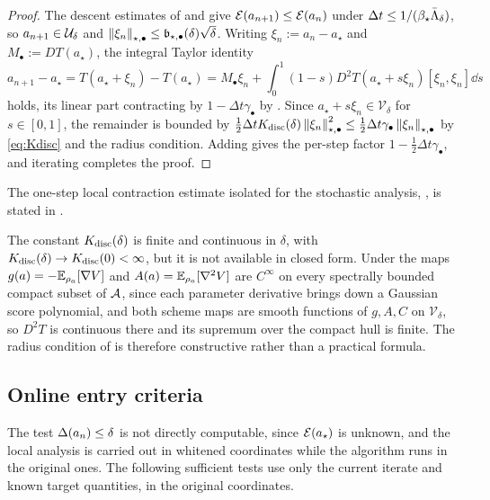 \begin{proof}
The descent estimates of  and  give
$\mathcal{E}(a_{n+1})\leq\mathcal{E}(a_n)$ under $\Delta t\leq1/(\beta_\star\bar\Lambda_\delta)$, so
$a_{n+1}\in\mathcal{U}_\delta$ and $\left\lVert \xi_n\right\rVert_{\star,\bullet}\leq\mathfrak b_{\star,\bullet}(\delta)\sqrt\delta$.
Writing $\xi_n:=a_n-a_\star$ and $M_\bullet:=DT(a_\star)$, the integral Taylor identity
\[
    a_{n+1}-a_\star=T(a_\star+\xi_n)-T(a_\star)
    =M_\bullet\xi_n+\int_0^1(1-s)D^2T(a_\star+s\xi_n)[\xi_n,\xi_n]\dd s
\]
holds, its linear part contracting by $1-\Delta t\gamma_\bullet$ by
. Since $a_\star+s\xi_n\in\mathcal V_\delta$ for $s\in[0,1]$, the
remainder is bounded by
$\tfrac12\Delta tK_{\mathrm{disc}}(\delta)\left\lVert \xi_n\right\rVert_{\star,\bullet}^2\leq\tfrac12\Delta t\gamma_\bullet\left\lVert \xi_n\right\rVert_{\star,\bullet}$
by \eqref{eq:Kdisc} and the radius condition. Adding gives the per-step factor
$1-\tfrac12\Delta t\gamma_\bullet$, and iterating completes the proof.
\end{proof}

The one-step local contraction estimate isolated for the stochastic analysis,
, is stated in .

\begin{remark}
\label{rem:Kdisc}
The constant $K_{\mathrm{disc}}(\delta)$ is finite and continuous in $\delta$, with
$K_{\mathrm{disc}}(\delta)\to K_{\mathrm{disc}}(0)<\infty$, but it is not available in closed form. Under
 the maps $g(a)=-\mathbb{E}_{\rho_a}[\nabla V]$ and
$A(a)=\mathbb{E}_{\rho_a}[\nabla^2V]$ are $C^\infty$ on every spectrally bounded compact subset of
$\mathcal{A}$, since each parameter derivative brings down a Gaussian score polynomial, and both
scheme maps are smooth functions of $g,A,C$ on $\mathcal V_\delta$, so $D^2T$ is continuous
there and its supremum over the compact hull is finite. The radius condition of
 is therefore constructive rather than a practical formula.
\end{remark}

\subsection{Online entry criteria}
\label{subsec:entry}

The test $\Delta(a_n)\leq\delta$ is not directly computable, since $\mathcal{E}(a_\star)$ is
unknown, and the local analysis is carried out in whitened coordinates while the algorithm runs
in the original ones. The following sufficient tests use only the current iterate and known
target quantities, in the original coordinates.

